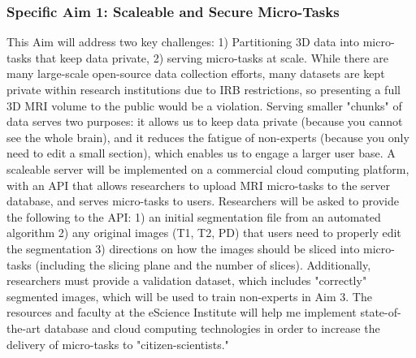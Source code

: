 \subsubsection*{Specific Aim 1: Scaleable and Secure Micro-Tasks}

This Aim will address two key challenges: 1) Partitioning 3D data into micro-tasks that keep data private, 2) serving micro-tasks at scale. While there are many large-scale open-source data collection efforts, many datasets are kept private within research institutions due to  IRB restrictions, so presenting a full 3D MRI volume to the public would be a violation. Serving smaller "chunks" of data serves two purposes: it allows us to keep data private (because you cannot see the whole brain), and it reduces the fatigue of non-experts (because you only need to edit a small section), which enables us to engage a larger user base. A scaleable server will be implemented on a commercial cloud computing platform, with an API that allows researchers to upload MRI micro-tasks to the server database, and serves micro-tasks to users. Researchers will be asked to provide the following to the API: 1) an initial segmentation file from an automated algorithm 2) any original images (T1, T2, PD) that users need to properly edit the segmentation 3) directions on how the images should be sliced into micro-tasks (including the slicing plane and the number of slices). Additionally, researchers must provide a validation dataset, which includes "correctly" segmented images, which will be used to train non-experts in Aim 3. The resources and faculty at the eScience Institute will help me implement state-of-the-art database and cloud computing technologies in order to increase the delivery of micro-tasks to "citizen-scientists."